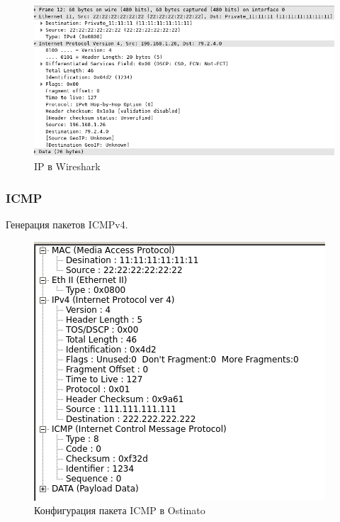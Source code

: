 \documentclass[12pt, a4paper] {ncc}
\begin{document}
	\begin{figure}[h!]
		\includegraphics[scale=0.4]{CapturedIP.png}
		\caption{IP в Wireshark}
		\center
	\end{figure}


\subsubsection*{ICMP}

	Генерация пакетов ICMPv4.  \\
	\begin{figure}[h!]
		\includegraphics[scale=0.5]{ICMPStream_without_frag.png}
		\caption{Конфигурация пакета ICMP в Ostinato}
		\center
	\end{figure}
\end{document}
